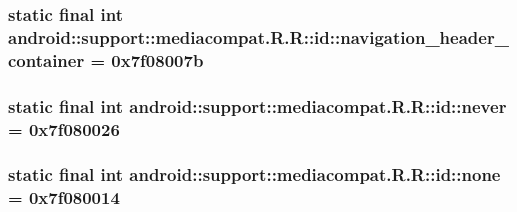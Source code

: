 \hypertarget{classandroid_1_1support_1_1mediacompat_1_1_r_1_1id_e784553f198b1d7c655f4299d48c728e}{
\subsubsection[{navigation\_\-header\_\-container}]{\setlength{\rightskip}{0pt plus 5cm}static final int android::support::mediacompat.R.R::id::navigation\_\-header\_\-container = 0x7f08007b}}
\label{classandroid_1_1support_1_1mediacompat_1_1_r_1_1id_e784553f198b1d7c655f4299d48c728e}


\hypertarget{classandroid_1_1support_1_1mediacompat_1_1_r_1_1id_e049f3223d4af47d54639cd2e410af34}{
\subsubsection[{never}]{\setlength{\rightskip}{0pt plus 5cm}static final int android::support::mediacompat.R.R::id::never = 0x7f080026}}
\label{classandroid_1_1support_1_1mediacompat_1_1_r_1_1id_e049f3223d4af47d54639cd2e410af34}


\hypertarget{classandroid_1_1support_1_1mediacompat_1_1_r_1_1id_224cc984b8dfbc9f6d382b652b362d54}{
\subsubsection[{none}]{\setlength{\rightskip}{0pt plus 5cm}static final int android::support::mediacompat.R.R::id::none = 0x7f080014}}
\label{classandroid_1_1support_1_1mediacompat_1_1_r_1_1id_224cc984b8dfbc9f6d382b652b362d54}



